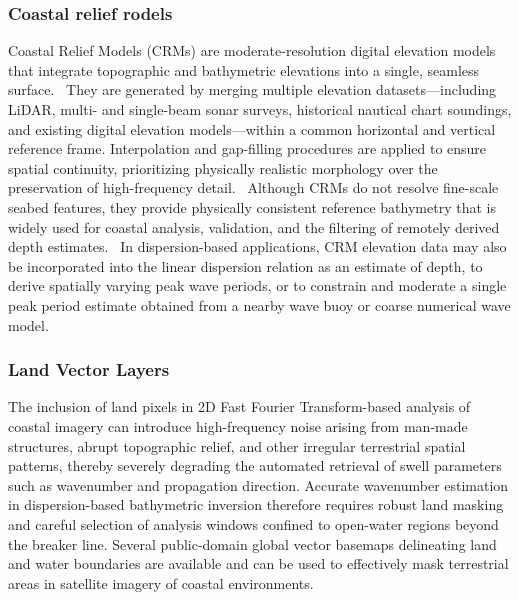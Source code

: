 \documentclass[12pt]{article}
\begin{document}
\subsubsection{Coastal relief rodels}

Coastal Relief Models (CRMs) are moderate-resolution digital elevation models that integrate topographic and bathymetric elevations into a single, seamless surface.~\cite{NOAACRMUserGuide2023} They are generated by merging multiple elevation datasets—including LiDAR, multi- and single-beam sonar surveys, historical nautical chart soundings, and existing digital elevation models—within a common horizontal and vertical reference frame. Interpolation and gap-filling procedures are applied to ensure spatial continuity, prioritizing physically realistic morphology over the preservation of high-frequency detail.~\cite{NOAACRMUserGuide2023} Although CRMs do not resolve fine-scale seabed features, they provide physically consistent reference bathymetry that is widely used for coastal analysis, validation, and the filtering of remotely derived depth estimates.~\cite{NOAACRMUserGuide2023} In dispersion-based applications, CRM elevation data may also be incorporated into the linear dispersion relation as an estimate of depth, to derive spatially varying peak wave periods, or to constrain and moderate a single peak period estimate obtained from a nearby wave buoy or coarse numerical wave model.~\cite{Mudiyanselage2024}

\subsubsection{Land Vector Layers}

The inclusion of land pixels in 2D Fast Fourier Transform-based analysis of coastal imagery can introduce high-frequency noise arising from man-made structures, abrupt topographic relief, and other irregular terrestrial spatial patterns, thereby severely degrading the automated retrieval of swell parameters such as wavenumber and propagation direction. Accurate wavenumber estimation in dispersion-based bathymetric inversion therefore requires robust land masking and careful selection of analysis windows confined to open-water regions beyond the breaker line. Several public-domain global vector basemaps delineating land and water boundaries are available and can be used to effectively mask terrestrial areas in satellite imagery of coastal environments.
\end{document}
